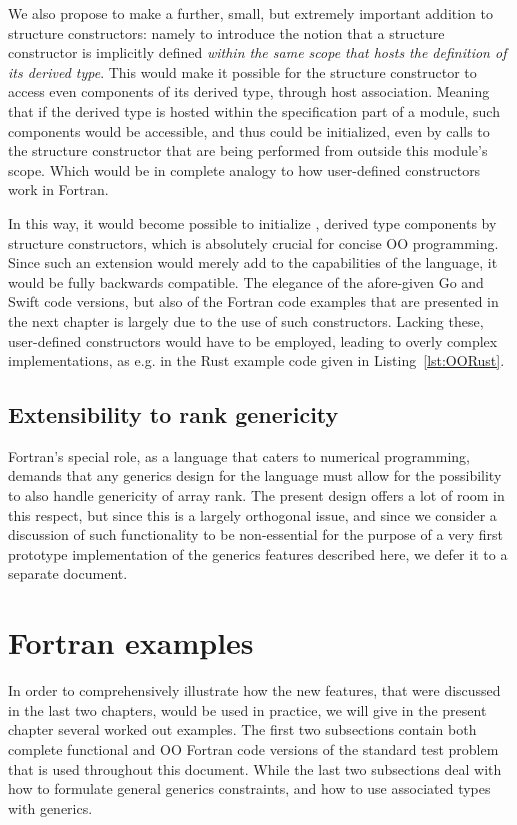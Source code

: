 \documentclass[11pt,oneside]{report}
\newcommand{\code}[1]{{\selectfont\ttfamily{#1}}}
\begin{document}
We also propose to make a further, small, but extremely important
addition to structure constructors: namely to introduce the notion
that a structure constructor is implicitly defined \emph{within the
same scope that hosts the definition of its derived type}. This would
make it possible for the structure constructor to access even
\code{private} components of its derived type, through host
association. Meaning that if the derived type is hosted within the
specification part of a module, such components would be accessible,
and thus could be initialized, even by calls to the structure
constructor that are being performed from outside this module's
scope. Which would be in complete analogy to how user-defined
constructors work in Fortran.

In this way, it would become possible to initialize \code{private},
\code{allocatable} derived type components by structure constructors,
which is absolutely crucial for concise OO programming. Since such an
extension would merely add to the capabilities of the language, it
would be fully backwards compatible. The elegance of the afore-given
Go and Swift code versions, but also of the Fortran code examples that
are presented in the next chapter is largely due to the use of such
constructors. Lacking these, user-defined constructors would have to
be employed, leading to overly complex implementations, as e.g. in the
Rust example code given in Listing~\ref{lst:OORust}.


\section{Extensibility to rank genericity}

Fortran's special role, as a language that caters to numerical
programming, demands that any generics design for the language must
allow for the possibility to also handle genericity of array rank. The
present design offers a lot of room in this respect, but since this is
a largely orthogonal issue, and since we consider a discussion of such
functionality to be non-essential for the purpose of a very first
prototype implementation of the generics features described here, we
defer it to a separate document.


\chapter{Fortran examples}
\label{chapt:fortran_examples}

In order to comprehensively illustrate how the new features, that were
discussed in the last two chapters, would be used in practice, we will
give in the present chapter several worked out examples. The first two
subsections contain both complete functional and OO Fortran code
versions of the standard test problem that is used throughout this
document. While the last two subsections deal with how to formulate
general generics constraints, and how to use associated types with
generics.
\end{document}
